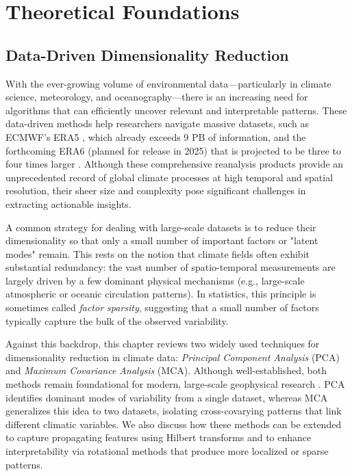 \ifpdf
    \graphicspath{{content/chapter3/figs/raster/}{content/chapter3/figs/pdf/}{content/chapter3/figs/}}
    \else
    \graphicspath{{content/chapter3/figs/vector/}{content/chapter3/figs/}}
    \fi
    

\part{Theoretical Foundations}\label{part:theory}

\chapter{Data-Driven Dimensionality Reduction}\label{chapter:dimred}

With the ever-growing volume of environmental data---particularly in climate science, meteorology, and oceanography---there is an increasing need for algorithms that can efficiently uncover relevant and interpretable patterns. These data-driven methods help researchers navigate massive datasets, such as ECMWF's ERA5 \cite{hersbach_era5_2020}, which already exceeds 9 PB of information, and the forthcoming ERA6 (planned for release in 2025) that is projected to be three to four times larger \cite{hans_hersbach_estimating_2025}. Although these comprehensive reanalysis products provide an unprecedented record of global climate processes at high temporal and spatial resolution, their sheer size and complexity pose significant challenges in extracting actionable insights.

A common strategy for dealing with large-scale datasets is to reduce their dimensionality so that only a small number of important factors or "latent modes" remain. This rests on the notion that climate fields often exhibit substantial redundancy: the vast number of spatio-temporal measurements are largely driven by a few dominant physical mechanisms (e.g., large-scale atmospheric or oceanic circulation patterns). In statistics, this principle is sometimes called \emph{factor sparsity}, suggesting that a small number of factors typically capture the bulk of the observed variability.

Against this backdrop, this chapter reviews two widely used techniques for dimensionality reduction in climate data: \emph{Principal Component Analysis} (PCA) and \emph{Maximum Covariance Analysis} (MCA). Although well-established, both methods remain foundational for modern, large-scale geophysical research \cite[e.g.][]{hannachi_patterns_2021,mori_reconciled_2019,di_capua_dominant_2020,rathore_improving_2021}. PCA identifies dominant modes of variability from a single dataset, whereas MCA generalizes this idea to two datasets, isolating cross-covarying patterns that link different climatic variables. We also discuss how these methods can be extended to capture propagating features using Hilbert transforms and to enhance interpretability via rotational methods that produce more localized or sparse patterns.

